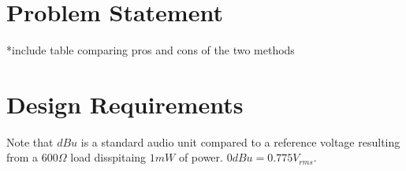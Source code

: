 \section{Problem Statement}
*include table comparing pros and cons of the two methods
\section{Design Requirements}

Note that $dBu$ is a standard audio unit compared to a reference voltage resulting from a $600\Omega$ load disspitaing $1mW$ of power.  $0dBu = 0.775V_{rms}$.